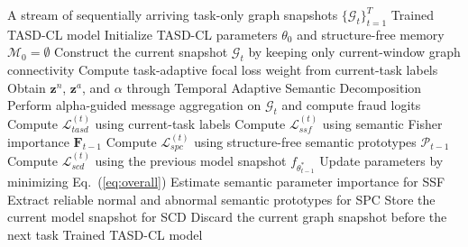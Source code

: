 \begin{algorithm}[t]
\caption{Training Procedure of TASD-CL}
\label{alg:tasdcl}
\begin{algorithmic}[1]
\REQUIRE A stream of sequentially arriving task-only graph snapshots $\{\mathcal{G}_t\}_{t=1}^{T}$
\ENSURE Trained TASD-CL model
\STATE Initialize TASD-CL parameters $\theta_0$ and structure-free memory $\mathcal{M}_0=\emptyset$
    \STATE Construct the current snapshot $\mathcal{G}_t$ by keeping only current-window graph connectivity
    \STATE Compute task-adaptive focal loss weight from current-task labels
        \STATE Obtain $\mathbf{z}^{n}$, $\mathbf{z}^{a}$, and $\alpha$ through Temporal Adaptive Semantic Decomposition
        \STATE Perform alpha-guided message aggregation on $\mathcal{G}_t$ and compute fraud logits
        \STATE Compute $\mathcal{L}_{tasd}^{(t)}$ using current-task labels
            \STATE Compute $\mathcal{L}_{ssf}^{(t)}$ using semantic Fisher importance $\mathbf{F}_{t-1}$
            \STATE Compute $\mathcal{L}_{spc}^{(t)}$ using structure-free semantic prototypes $\mathcal{P}_{t-1}$
            \STATE Compute $\mathcal{L}_{scd}^{(t)}$ using the previous model snapshot $f_{\theta^*_{t-1}}$
        \ENDIF
        \STATE Update parameters by minimizing Eq.~(\ref{eq:overall})
    \ENDFOR
    \STATE Estimate semantic parameter importance for SSF
    \STATE Extract reliable normal and abnormal semantic prototypes for SPC
    \STATE Store the current model snapshot for SCD
    \STATE Discard the current graph snapshot before the next task
\ENDFOR
\RETURN Trained TASD-CL model
\end{algorithmic}
\end{algorithm}
